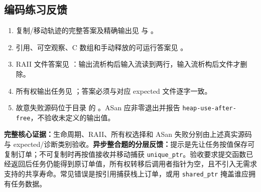 \subsection*{编码练习反馈}
\begin{enumerate}
  \item 复制/移动轨迹的完整答案及精确输出见  与 。
  \item 引用、可空观察、C 数组和手动释放的可运行答案见 。
  \item RAII 文件答案见 ：输出流析构后输入流读到两行，输入流析构后文件才删除。
  \item 所有权输出任务见 ；答案必须与对应 expected 文件逐字一致。
  \item 故意失败源码位于目录  的 。ASan 应非零退出并报告 \texttt{heap-use-after-free}，不验收未定义的输出值。
\end{enumerate}

\noindent\textbf{完整核心证据：}生命周期、RAII、所有权选择和 ASan 失败分别由上述真实源码与 expected/诊断类别验收。\textbf{异步整合题的分层反馈：}提示是先让任务按值保存可复制订单；不可复制时再按值接收并移动捕获 \texttt{unique\_ptr}。验收要求提交函数已经返回后任务仍能得到原订单值，所有权转移后调用者指针为空，且不引入无需求支持的共享寿命。常见错误是按引用捕获栈上订单，或用 \texttt{shared\_ptr} 掩盖谁应拥有任务数据。

